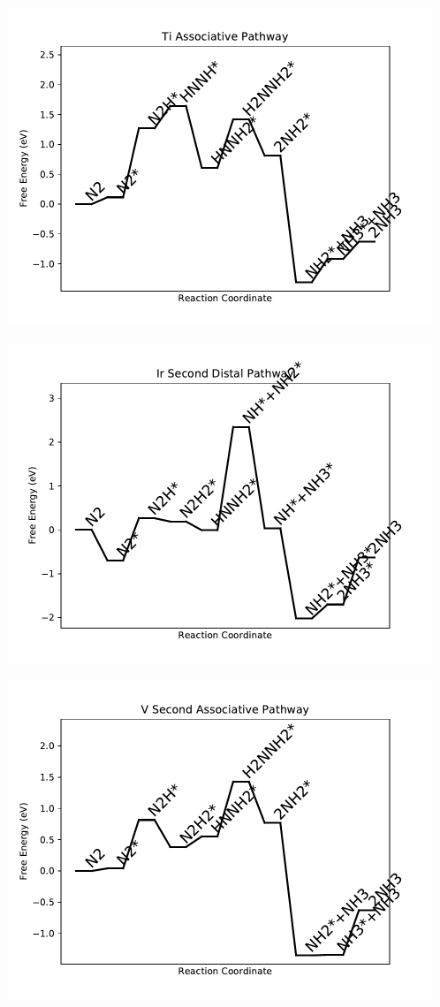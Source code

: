 \documentclass[journal=jacsat,manuscript=article]{achemso}
\begin{document}
\newpage
\begin{figure}
\includegraphics[width=1\linewidth]{data/plots/Ti_associative.pdf}
\label{fig:Ti_associative}
\end{figure}

\begin{figure}
\includegraphics[width=1\linewidth]{data/plots/Ir_distal_2.pdf}
\label{fig:Ir_distal_2}
\end{figure}

\newpage
\begin{figure}
\includegraphics[width=0.5\linewidth]{data/plots/V_associative_2.pdf}
\label{fig:V_associative_2}
\end{figure}
\end{document}
